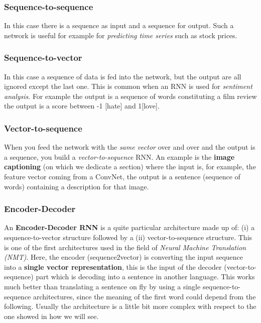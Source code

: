 \subsubsection{Sequence-to-sequence}\vspace{-0.2cm}
In this case there is a sequence as input and a sequence for output. Such a network is useful for example for \textit{predicting time series} such as stock prices.
\vspace{-0.2cm}
\subsubsection{Sequence-to-vector}\vspace{-0.2cm}

In this case a sequence of data is fed into the network, but the output are all ignored except the last one. This is common when an RNN is used for \textit{sentiment analysis}. For example the output is a sequence of words constituting a film review the output is a score between -1 [hate] and 1[love].
\vspace{-0.2cm}
\subsubsection{Vector-to-sequence}\vspace{-0.2cm}

When you feed the network with the \textit{same vector} over and over and the output is a sequence, you build a \textit{vector-to-sequence} RNN. An example is the \textbf{image captioning} (on which we dedicate a section) where the input is, for example, the feature vector coming from a ConvNet, the output is a sentence (sequence of words) containing a description for that image.

\subsubsection{Encoder-Decoder}
An \textbf{Encoder-Decoder RNN} is a quite particular architecture made up of: (i) a sequence-to-vector structure followed by a (ii) vector-to-sequence structure. This is one of the first architectures used in the field of \textit{Neural Machine Translation (NMT)}. Here, the encoder (sequence2vector) is converting the input sequence into a \textbf{single vector representation}, this is the input of the decoder (vector-to-sequence) part which is decoding  into a sentence in another language. This works much better than translating a sentence on fly by using a single sequence-to-sequence architectures, since the meaning of the first word could depend from the following. Usually the architecture is a little bit more complex with respect to the one showed in  how we will see.

